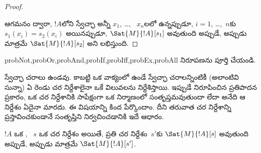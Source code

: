 \documentclass[../../../include/open-logic-section]{subfiles}
\begin{document}
\begin{proof}
\begin{enumerate}
\end{enumerate}
ఆగమనం ద్వారా, $!A$లోని స్వేచ్ఛా  అన్నీ
$x_1$, \dots, ~$x_n$లలో ఉన్నప్పుడూ, $i = 1$, \dots,~$n$కు
$s_1(x_i)=s_2(x_i)$ అయినప్పుడూ, $\Sat{M}{!A}[s_1]$ అవుతుంది అప్పుడే,
అప్పుడు మాత్రమే $\Sat{M}{!A}[s_2]$ అని లభిస్తుంది.
\end{proof}

\begin{probtag}{probNot,probOr,probAnd,probIf,probIff,probEx,probAll}
 నిరూపణను పూర్తి చేయండి.
\end{probtag}

\begin{explain}
 స్వేచ్ఛా చరాలు ఉండవు. కాబట్టి ఒక వాక్యంలో ఉండే
స్వేచ్ఛా చరాలన్నింటికీ (అలాంటివి సున్నా) ఏ రెండు చర నిర్దేశాలైనా ఒకే విలువలను
నిర్దేశిస్తాయి. ఇప్పుడే నిరూపించిన ప్రతిపాదన ప్రకారం, ఒక చర నిర్దేశానికి
సాపేక్షంగా ఒక నిర్మాణంలో  సంతృప్తమవుతుందా లేదా అనేది ఆ
నిర్దేశం ఏదైనా మారదు. ఈ విషయాన్ని కింద పేర్కొందాం. దీని తరువాత
చర నిర్దేశాన్ని ప్రస్తావించకుండానే  
సంతృప్తిని నిర్వచించడానికి ఇదే ఆధారం.
\end{explain}

\begin{cor}
$!A$ ఒక , ~$s$ ఒక చర నిర్దేశం అయితే, ప్రతి చర
నిర్దేశం~$s'$కు $\Sat{M}{!A}[s]$ అవుతుంది అప్పుడే, అప్పుడు మాత్రమే
$\Sat{M}{!A}[s']$.
\end{cor}
\end{document}
